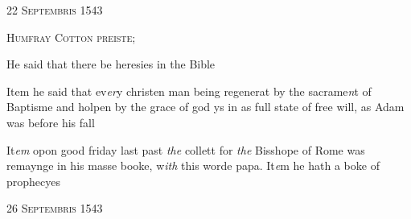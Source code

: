 \documentclass[12pt, a4paper]{book}
\begin{document}
 

            
            
               
				\begin{center} \begin{large} {\scshape 
                  22 Septembris 1543
               } \end{large} \end{center}
			
               
                  
				\begin{center}  {\scshape Humfray Cotton preiste;}  \end{center}
			
               	
               		
		\ifthenelse{\isodd{\thepage}}
		{\reversemarginpar}
		{\normalmarginpar}
		He said that there be heresies in the Bible
               	

	
				\marginpar[\vspace{0.5cm}{\textcolor{Gray}{ herecie}}]{}
			
	
			
               	
		\ifthenelse{\isodd{\thepage}}
		{\reversemarginpar}
		{\normalmarginpar}
		Item he said that ev\textit{er}y christen man being regenerat
 by the sacrame\textit{n}t of Baptisme and holpen by the
 grace of god ys in as full state of free will, as
 Adam was before his fall

 
 	
			
 	
		\ifthenelse{\isodd{\thepage}}
		{\reversemarginpar}
		{\normalmarginpar}
		It\textit{em} opon good friday last past \textit{the} collett for \textit{the} Bisshope of Rome was
 remaynge in his masse booke, w\textit{ith} this worde papa.
 	It\textit{e}m he hath a boke of prophecyes
 
 

            
            
               
				\begin{center} \begin{large} {\scshape 
                  26 Septembris 1543
               } \end{large} \end{center}
			
\end{document}
